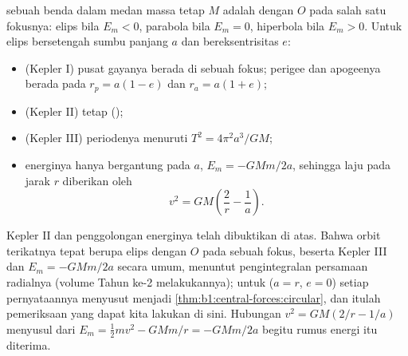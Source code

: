 \begin{theorem}\label{thm:b1:central-forces:conics}
 sebuah benda dalam medan massa tetap $M$ adalah 
dengan $O$ pada salah satu fokusnya: elips bila $E_m < 0$, parabola bila
$E_m = 0$, hiperbola bila $E_m > 0$. Untuk elips bersetengah sumbu
panjang $a$ dan bereksentrisitas $e$:
\begin{itemize}
  \item (Kepler I) pusat gayanya berada di sebuah fokus; perigee dan
        apogeenya berada pada $r_p = a(1 - e)$ dan $r_a = a(1 + e)$;
  \item (Kepler II)  tetap ();
  \item (Kepler III) periodenya menuruti $T^2 = 4\pi^2a^3/GM$;
  \item energinya hanya bergantung pada $a$, $E_m = -GMm/2a$, sehingga
        laju pada jarak $r$ diberikan oleh
        \[
        v^2 = GM\left(\frac{2}{r} - \frac{1}{a}\right) .
        \]
\end{itemize}
\end{theorem}
\admitted

\begin{remark}\label{rem:b1:central-forces:admitted}
Kepler II dan penggolongan energinya telah dibuktikan di atas. Bahwa
orbit terikatnya tepat berupa elips dengan $O$ pada sebuah fokus,
beserta Kepler III dan $E_m = -GMm/2a$ secara umum, menuntut
pengintegralan persamaan radialnya (volume Tahun ke-2 melakukannya);
untuk  ($a = r$, $e = 0$) setiap pernyataannya menyusut
menjadi \cref{thm:b1:central-forces:circular}, dan itulah pemeriksaan
yang dapat kita lakukan di sini. Hubungan $v^2 = GM(2/r - 1/a)$ menyusul
dari $E_m = \tfrac12 mv^2 - GMm/r = -GMm/2a$ begitu rumus energi itu diterima.
\end{remark}

